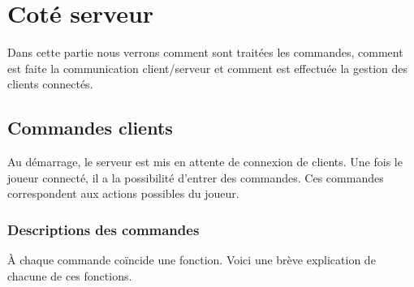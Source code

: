 \documentclass[a4paper,10pt]{article}
\begin{document}


	\newpage
	\section{Coté serveur}
	Dans cette partie nous verrons comment sont traitées les commandes, comment est faite la communication client/serveur et comment est effectuée la gestion
des clients connectés.

	\subsection{Commandes clients}
	Au démarrage, le serveur est mis en attente de connexion de clients.
	Une fois le joueur connecté, il a la possibilité d'entrer des commandes. Ces commandes correspondent aux actions possibles du joueur.
	\subsubsection{Descriptions des commandes}
	À chaque commande coïncide une fonction. Voici une brève explication de chacune de ces fonctions.
\end{document}

